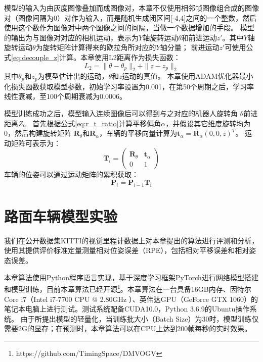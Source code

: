 模型的输入为由灰度图像叠加而成图像对，本章不仅使用相邻帧图像组合成的图像对（图像间隔为0）对作为输入，而是随机生成闭区间[-4,4]之间的一个整数，然后使用这个数作为图像对中两个图像之间的间隔，当做一个数据增加的手段。
模型的输出为与图像对对应的相机运动，表示为$Y$轴旋转运动$\theta $和前进运动$z'$。其中$Y$轴旋转运动$\theta$为旋转矩阵计算得来的欧拉角所对应的$Y$轴分量；
前进运动$z'$可使用公式\eqref{eq:decouple_z}计算。本章使用L2距离作为损失函数：
\begin{equation}
    L_2 = \|\underline{\theta} -\theta_p\|_2 +\|\underline{z} -z_p \|_2
\end{equation}
其中$\theta_p$和$z_p$为模型估计出的运动，$\underline{\theta}$和$\underline{z}$运动的真值。
本章使用ADAM优化器\cite{kingma2014adam}最小化损失函数获取模型参数，初始学习率设置为0.001，在第50个周期之后，学习率线性衰减，至100个周期衰减为0.0006。

模型训练成功之后，模型输入连续图像后可以得到与之对应的机器人旋转角 $\theta$前进距离$Z$。
首先根据公式\eqref{eq:r_t_ratio}计算平移偏角$\alpha$，并假设其它维度旋转均为0，然后构建旋转矩阵
$\mathbf{R}_\theta$和$\mathbf{R}_\alpha$，车辆的平移向量计算为$\mathbf{t}_\alpha = \mathbf{R}_\alpha (0,0,z)^T$。
运动矩阵可表示为：
\begin{equation}
    \mathbf{T}_i =\begin{pmatrix} \mathbf{R}_\theta & \mathbf{t}_\alpha\\ 0 & 1  \end{pmatrix} 
    \label{eq:rt_final}
\end{equation}
车辆的位姿可以通过运动矩阵的累积获取：
\begin{equation}
    \mathbf{P}_i = \mathbf{P}_{i-1}\mathbf{T}_i
    \label{eq:pose}
\end{equation}

\section{路面车辆模型实验}
\label{sec:datavo_experiments}
我们在公开数据集KITTI的视觉里程计数据\cite{geiger2012kitti}上对本章提出的算法进行评测和分析，使用其提供评价标准定量测量相对位姿误差（RPE），包括相对平移误差和相对姿态误差\cite{geiger2012kitti}。

本章算法使用Python程序语言实现，基于深度学习框架PyTorch进行网络模型搭建和模型训练，目前本章算法已经开源\footnote{https://github.com/TimingSpace/DMVOGV}。本章算法在一台具备16GB内存、因特尔Core i7（Intel i7-7700 CPU @ 2.80GHz ）、英伟达GPU（GeForce GTX 1060）的笔记本电脑上进行测试。测试系统配备CUDA10.0，Python 3.6.9的Ubuntu操作系统。
由于所提出模型的轻量化，当训练批大小（Batch Size）为30时，模型训练仅需要2G的显存；在预测时，本章算法可以在CPU上达到200帧每秒的实时效果。

